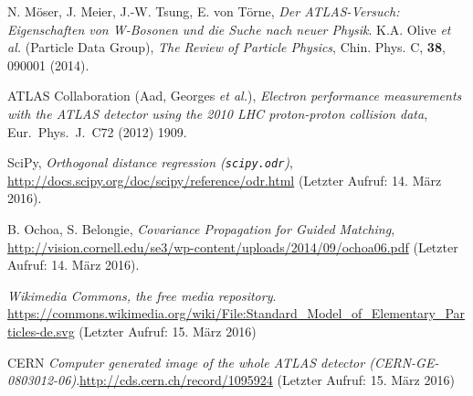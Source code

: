 \documentclass[11pt, a4paper]{article}
\numberwithin{equation}{section}
\begin{document}
\FloatBarrier
\vspace{\fill}
\begin{thebibliography}{19}
	N. Möser, J. Meier, J.-W. Tsung, E. von Törne,
	\emph{Der ATLAS-Versuch: Eigenschaften von W-Bosonen und die Suche nach neuer Physik}.
	K.A. Olive \textit{et al.} (Particle Data Group),
	\emph{The Review of Particle Physics},
	Chin. Phys. C, \textbf{38}, 090001 (2014).

	ATLAS Collaboration (Aad, Georges \textit{et al.}),
	\emph{Electron performance measurements with the ATLAS detector using the 2010 LHC proton-proton collision data},
	Eur.\ Phys.\ J.\ C72 (2012) 1909.

	SciPy,
	\emph{Orthogonal distance regression (\texttt{scipy.odr})},
	\url{http://docs.scipy.org/doc/scipy/reference/odr.html} (Letzter Aufruf: 14. März 2016).

	B. Ochoa, S. Belongie,
	\emph{Covariance Propagation for Guided Matching},
	\url{http://vision.cornell.edu/se3/wp-content/uploads/2014/09/ochoa06.pdf} (Letzter Aufruf: 14. März 2016).
	
	\emph{Wikimedia Commons, the free media repository}. \url{https://commons.wikimedia.org/wiki/File:Standard_Model_of_Elementary_Particles-de.svg} (Letzter Aufruf: 15. März 2016)
	
	CERN \emph{Computer generated image of the whole ATLAS detector (CERN-GE-0803012-06)}.\url{http://cds.cern.ch/record/1095924} (Letzter Aufruf: 15. März 2016)
\end{thebibliography}
\end{document}
